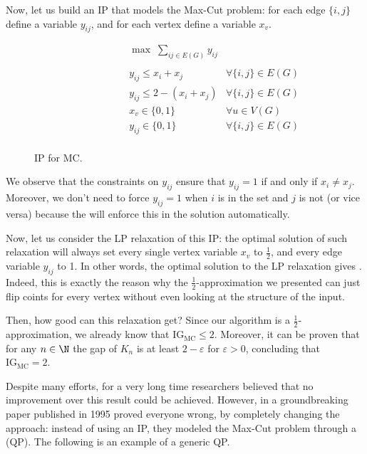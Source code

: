 \documentclass[a4paper, 12pt]{report}
\begin{document}
    Now, let us build an IP that models the Max-Cut problem: for each edge $\{i, j\}$ define a variable $y_{ij}$, and for each vertex define a variable $x_v$.

    \begin{figure}[H]
        \centering
        \[\begin{array}{ccl}
            \qquad\qquad\quad
            & \max \; \displaystyle \sum_{ij \in E(G)}{y_{ij}} \\\\
            & y_{ij} \le x_i + x_j & \forall \{i, j\} \in E(G) \\
            & y_{ij} \le 2 - (x_i + x_j) & \forall \{i, j\} \in E(G) \\
            & x_v \in \{0,1\} & \forall u \in V(G) \\
            & y_{ij} \in \{0,1\} & \forall \{i, j\} \in E(G) \\
        \end{array}\]
        \caption{IP for MC.}
    \end{figure}

    We observe that the constraints on $y_{ij}$ ensure that $y_{ij} = 1$ if and only if $x_i \neq x_j$. Moreover, we don't need to force $y_{ij} = 1$ when $i$ is in the set and $j$ is not (or vice versa) because the  will enforce this in the solution automatically.

    Now, let us consider the LP relaxation of this IP: the optimal solution of such relaxation will always set every single vertex variable $x_v$ to $\tfrac{1}{2}$, and every edge variable $y_{ij}$ to 1. In other words, the optimal solution to the LP relaxation gives . Indeed, this is exactly the reason why the $\tfrac{1}{2}$-approximation we presented can just flip coints for every vertex without even looking at the structure of the input.

    Then, how good can this relaxation get? Since our algorithm is a $\tfrac{1}{2}$-approximation, we already know that $\mbox{IG}_\mathrm{MC} \le 2$. Moreover, it can be proven that for any $n \in \N$ the gap of $K_n$ is at least $2 - \varepsilon$ for $\varepsilon > 0$, concluding that $\mbox{IG}_{\mathrm{MC}} = 2$.

    Despite many efforts, for a very long time researchers believed that no improvement over this result could be achieved. However, in a groundbreaking paper published in 1995 \textcite{goemans} proved everyone wrong, by completely changing the approach: instead of using an IP, they modeled the Max-Cut problem through a  (QP). The following is an example of a generic QP.
\end{document}
